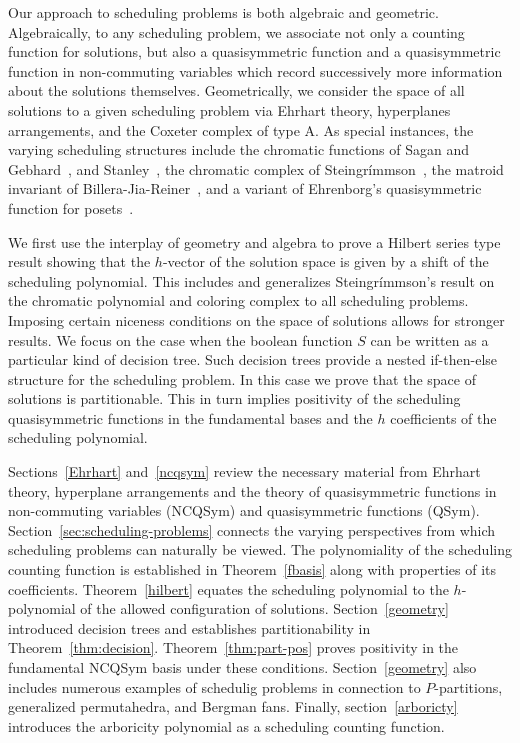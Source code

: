 \documentclass[12pt,reqno]{amsart}
\numberwithin{definition}{section}
\theoremstyle{definition}
\begin{document}
Our approach to scheduling problems is both algebraic and geometric.
Algebraically, to any scheduling problem, we associate not only a
counting function for solutions, but also a quasisymmetric function
and a quasisymmetric function in non-commuting variables which record
successively more information about the solutions themselves.
Geometrically, we consider the space of all solutions to a given
scheduling problem via Ehrhart theory, hyperplanes arrangements, and
the Coxeter complex of type A.  As special instances, the varying scheduling structures include the
chromatic functions of Sagan and Gebhard~\cite{GS}, and Stanley~\cite{stan-chromatic}, the chromatic
complex of Stein\-gr\'{i}mm\-son~\cite{Ein}, the matroid invariant of Billera-Jia-Reiner~\cite{BJR},
and a variant of Ehrenborg's quasisymmetric function for posets~\cite{Ehrenborg}.





We first use the interplay of geometry and algebra to prove a Hilbert
series type result showing that the $h$-vector of the solution space
is given by a shift of the scheduling polynomial.  This includes and
generalizes Stein\-gr\'{i}mm\-son's result on the chromatic polynomial and
coloring complex to all scheduling problems.  Imposing certain
niceness conditions on the space of solutions allows for stronger
results.  We focus on the case when the boolean function $S$ can be
written as a particular kind of decision tree.  Such decision trees
provide a nested if-then-else structure for the scheduling problem.
In this case we prove that the space of solutions is partitionable.
This in turn implies positivity of the scheduling quasisymmetric
functions in the fundamental bases and the $h$ coefficients of the
scheduling polynomial.

 

Sections~\ref{Ehrhart} and~\ref{ncqsym} review the necessary material
from Ehrhart theory, hyperplane arrangements and the theory of
quasisymmetric functions in non-commuting variables (NCQSym) and
quasisymmetric functions (QSym).  Section~\ref{sec:scheduling-problems} connects the varying perspectives from which 
scheduling problems can naturally be viewed.
 The polynomiality of the scheduling counting function is established
 in Theorem~\ref{fbasis} along with properties of its coefficients.
 Theorem~\ref{hilbert} equates the scheduling polynomial to the
 $h$-polynomial of the allowed configuration of solutions.
 Section~\ref{geometry} introduced decision trees and establishes
 partitionability in Theorem~\ref{thm:decision}.  Theorem~\ref{thm:part-pos} proves positivity
 in the fundamental NCQSym basis under these conditions.
 Section~\ref{geometry} also includes numerous examples of schedulig
 problems in connection to $P$-partitions, generalized permutahedra,
 and Bergman fans.  Finally, section~\ref{arboricty} introduces the
 arboricity polynomial as a scheduling counting function.
\end{document}
